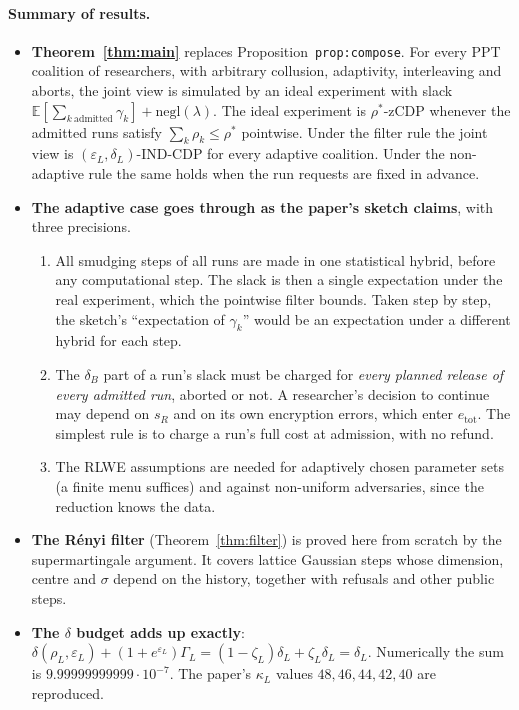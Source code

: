 \documentclass[11pt]{article}
\theoremstyle{definition}
\theoremstyle{plain}
\newcommand{\Ex}{\mathbb{E}}
\newcommand{\negl}{\mathrm{negl}}
\newcommand{\etot}{e_{\mathrm{tot}}}
\begin{document}
\paragraph{Summary of results.}
\begin{itemize}[nosep]
  \item \textbf{Theorem~\ref{thm:main}} replaces Proposition~\texttt{prop:compose}. For every PPT coalition of researchers, with arbitrary collusion, adaptivity, interleaving and aborts, the joint view is simulated by an ideal experiment with slack $\Ex[\sum_{k\ \mathrm{admitted}}\gamma_k]+\negl(\lambda)$. The ideal experiment is $\rho^*$-zCDP whenever the admitted runs satisfy $\sum_k\rho_k\le\rho^*$ pointwise. Under the filter rule the joint view is $(\varepsilon_L,\delta_L)$-IND-CDP for every adaptive coalition. Under the non-adaptive rule the same holds when the run requests are fixed in advance.
  \item \textbf{The adaptive case goes through as the paper's sketch claims}, with three precisions.
  \begin{enumerate}[nosep,label=(\roman*)]
    \item All smudging steps of all runs are made in one statistical hybrid, before any computational step. The slack is then a single expectation under the real experiment, which the pointwise filter bounds. Taken step by step, the sketch's ``expectation of $\gamma_k$'' would be an expectation under a different hybrid for each step.
    \item The $\delta_B$ part of a run's slack must be charged for \emph{every planned release of every admitted run}, aborted or not. A researcher's decision to continue may depend on $s_R$ and on its own encryption errors, which enter $\etot$. The simplest rule is to charge a run's full cost at admission, with no refund.
    \item The RLWE assumptions are needed for adaptively chosen parameter sets (a finite menu suffices) and against non-uniform adversaries, since the reduction knows the data.
  \end{enumerate}
  \item \textbf{The R\'enyi filter} (Theorem~\ref{thm:filter}) is proved here from scratch by the supermartingale argument. It covers lattice Gaussian steps whose dimension, centre and $\sigma$ depend on the history, together with refusals and other public steps.
  \item \textbf{The $\delta$ budget adds up exactly}: $\delta(\rho_L,\varepsilon_L)+(1+e^{\varepsilon_L})\Gamma_L=(1-\zeta_L)\delta_L+\zeta_L\delta_L=\delta_L$. Numerically the sum is $9.99999999999\cdot10^{-7}$. The paper's $\kappa_L$ values $48,46,44,42,40$ are reproduced.

\end{itemize}
\end{document}
